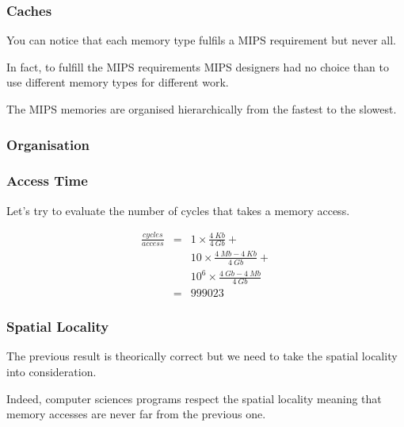 
\begin{frame}
  \frametitle{Caches}

  You can notice that each memory type fulfils a MIPS requirement but never
  all.

  \-

  In fact, to fulfill the MIPS requirements MIPS designers had no choice than
  to use different memory types for different work.

  \-

  The MIPS memories are organised hierarchically from the fastest to the
  slowest.
\end{frame}


\begin{frame}
  \frametitle{Organisation}

  \begin{center}
  \end{center}
\end{frame}


\begin{frame}
  \frametitle{Access Time}

  Let's try to evaluate the number of cycles that takes a memory access.

  \begin{center}
  \end{center}

  \begin{eqnarray*}
    \frac{cycles}{access} & = & 1 \times \frac{4~Kb}{4~Gb} + \\
                          &   & 10 \times \frac{4~Mb - 4~Kb}{4~Gb} + \\
                          &   & 10^{6} \times \frac{4~Gb - 4~Mb}{4~Gb} \\
                          & = & 999 023
  \end{eqnarray*}
\end{frame}


\begin{frame}
  \frametitle{Spatial Locality}

  The previous result is theorically correct but we need to take the
  spatial locality into consideration.

  \-

  Indeed, computer sciences programs respect the spatial locality meaning
  that memory accesses are never far from the previous one.

  \begin{center}
  \end{center}
\end{frame}

